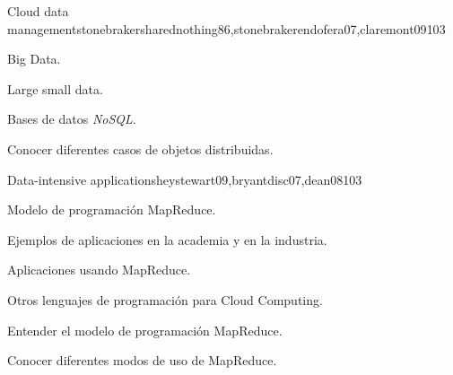 \begin{syllabus}
\begin{unit}{Cloud data management}{stonebrakersharednothing86,stonebrakerendofera07,claremont09}{10}{3}
   \begin{topics}
      \item \IMInformationModelsTopicInformationStorage%
      \item \IMInformationModelsTopicSearch%
      \item \IMInformationModelsTopicScalability%
      \item \IMDatabaseSystemsTopicDatabase%
      \item \IMDistributedDatabasesAllTopics%
      \item Big Data.
      \item Large small data.
      \item Bases de datos \textit{NoSQL}.
   \end{topics}

    \begin{unitgoals}
      \item \IMInformationModelsObjTWO%
      \item \IMInformationModelsObjSEVEN%
      \item \IMInformationModelsObjEIGHT%
      \item \IMInformationModelsObjNINE%
      \item \IMDistributedDatabasesObjTWO%
      \item Conocer diferentes casos de objetos distribuidas.
   \end{unitgoals}
\end{unit}


\begin{unit}{Data-intensive applications}{heystewart09,bryantdisc07,dean08}{10}{3}
    \begin{topics}
      \item Modelo de programación MapReduce.
      \item Ejemplos de aplicaciones en la academia y en la industria.
      \item Aplicaciones usando MapReduce.
      \item Otros lenguajes de programación para Cloud Computing.
   \end{topics}

   \begin{unitgoals}
      \item Entender el modelo de programación MapReduce.
      \item Conocer diferentes modos de uso de MapReduce. 
      \item \IMInformationModelsObjEIGHT%
      \item \IMInformationModelsObjNINE%
      \item \IMDistributedDatabasesObjTWO%
   \end{unitgoals}
\end{unit}



\end{syllabus}
